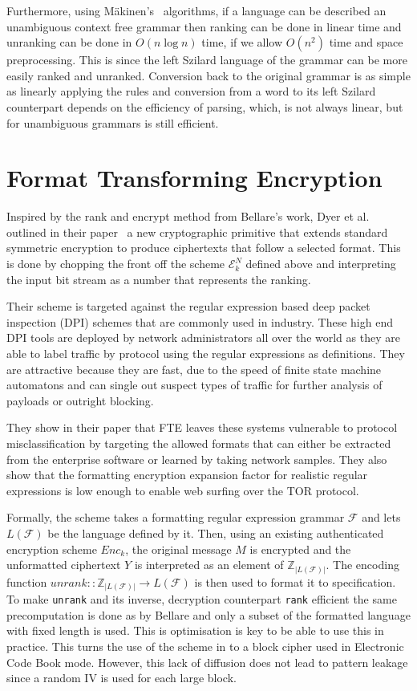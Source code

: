 \documentclass[ %
                    author={Samuel Russell},
                supervisor={Prof. Bogdan Warinschi},
                    degree={MEng},
                     title={Innocuous Ciphertexts},
                  subtitle={The DE-CENSOR Scheme},
                      type={research},
                      year={2018} ]{dissertation}
\begin{document}
Furthermore, using M\"akinen's~\cite{rankcf} algorithms, if a language can be described an unambiguous context free grammar then ranking can be done in linear time and unranking can be done in $O(n \log n)$ time, if we allow $O(n^2)$ time and space preprocessing. This is since the left Szilard language of the grammar can be more easily ranked and unranked. Conversion back to the original grammar is as simple as linearly applying the rules and conversion from a word to its left Szilard counterpart depends on the efficiency of parsing, which, is not always linear, but for unambiguous grammars is still efficient.

\section{Format Transforming Encryption}\label{sec:FTE}

Inspired by the rank and encrypt method from Bellare's work, Dyer et al. outlined in their paper~\cite{fte} a new cryptographic primitive that extends standard symmetric encryption to produce ciphertexts that follow a selected format. This is done by chopping the front off the scheme $\mathcal{E}^N_k$ defined above and interpreting the input bit stream as a number that represents the ranking.

Their scheme is targeted against the regular expression based deep packet inspection (DPI) schemes that are commonly used in industry. These high end DPI tools are deployed by network administrators all over the world as they are able to label traffic by protocol using the regular expressions as definitions. They are attractive because they are fast, due to the speed of finite state machine automatons and can single out suspect types of traffic for further analysis of payloads or outright blocking.

They show in their paper that FTE leaves these systems vulnerable to protocol misclassification by targeting the allowed formats that can either be extracted from the enterprise software or learned by taking network samples. They also show that the formatting encryption expansion factor for realistic regular expressions is low enough to enable web surfing over the TOR protocol.

Formally, the scheme takes a formatting regular expression grammar $\mathcal{F}$ and lets $L(\mathcal{F})$ be the language defined by it. Then, using an existing authenticated encryption scheme $Enc_k$, the original message $M$ is encrypted and the unformatted ciphertext $Y$ is interpreted as an element of $\mathbb{Z}_{\vert L(\mathcal{F}) \vert}$. The encoding function $unrank :: \mathbb{Z}_{\vert L(\mathcal{F}) \vert} \rightarrow L(\mathcal{F})$ is then used to format it to specification. To make \texttt{unrank} and its inverse, decryption counterpart \texttt{rank} efficient the same precomputation is done as by Bellare and only a subset of the formatted language with fixed length is used. This is optimisation is key to be able to use this in practice. This turns the use of the scheme in to a block cipher used in Electronic Code Book mode. However, this lack of diffusion does not lead to pattern leakage since a random IV is used for each large block.
\end{document}

